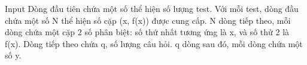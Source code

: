 Input  
Dòng đầu tiên chứa một số thể hiện số lượng test. Với mỗi test, dòng đầu chứa một số N thể hiện số cặp (x, f(x)) được cung cấp. N dòng tiếp theo, mỗi dòng chứa một cặp 2 số phân biệt: số thứ nhất tương ứng là x, và số thứ 2 là f(x). Dòng tiếp theo chứa q, số lượng câu hỏi. q dòng sau đó, mỗi dòng chứa một số y.